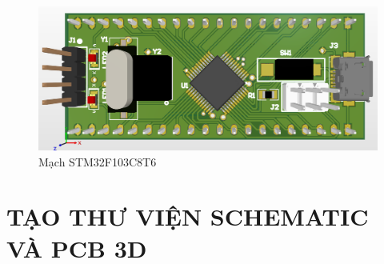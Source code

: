             \begin{figure}[H]
                \centering
                \includegraphics[width=1\textwidth]{pictures/pcb5.png}
                \caption{Mạch STM32F103C8T6}
                \label{fig:hbridge}
            \end{figure}
            \cleardoublepage
        \section{TẠO THƯ VIỆN SCHEMATIC VÀ PCB 3D}
